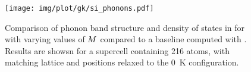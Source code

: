 \vspace{2\baselineskip}

\begin{figure}
  \texttt{[image: img/plot/gk/si\_phonons.pdf]}
  \caption{
  Comparison of phonon band structure and density of states in  for \sok with varying values of $M$ compared to a baseline computed with \aims.
  Results are showsn for a supercell containing \num{216} atoms, with matching lattice and positions relaxed to the \qty{0}{K} configuration.
  }
  \label{fig:gko_si_phonons}
\end{figure}
